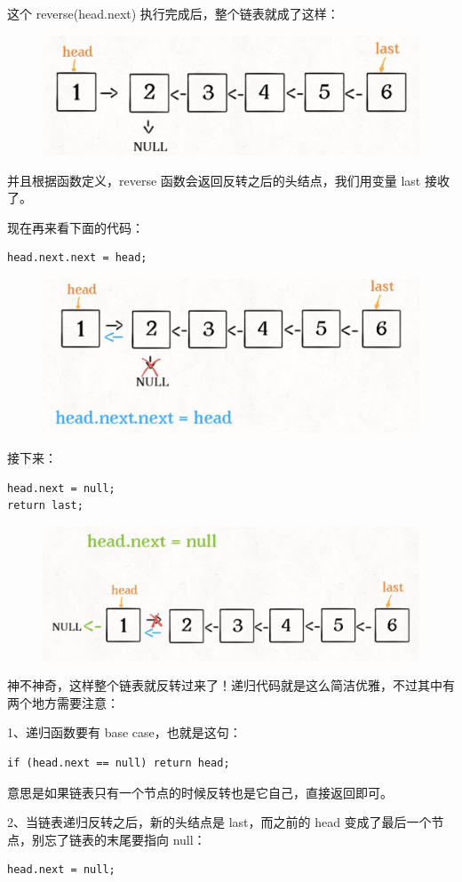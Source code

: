 \documentclass[12pt]{article}
\begin{document}
这个 reverse(head.next) 执行完成后，整个链表就成了这样：
\begin{figure}[H]
    \centering
    \includegraphics[width=.5\textwidth]{fig/Reverse_Single_List_4.png}
\end{figure}

并且根据函数定义，reverse 函数会返回反转之后的头结点，我们用变量 last 接收了。

现在再来看下面的代码：
\begin{lstlisting}
head.next.next = head;
\end{lstlisting}

\begin{figure}[H]
    \centering
    \includegraphics[width=.5\textwidth]{fig/Reverse_Single_List_5.png}
\end{figure}

接下来：
\begin{lstlisting}
head.next = null;
return last;
\end{lstlisting}

\begin{figure}[H]
    \centering
    \includegraphics[width=.5\textwidth]{fig/Reverse_Single_List_6.png}
\end{figure}

神不神奇，这样整个链表就反转过来了！递归代码就是这么简洁优雅，不过其中有两个地方需要注意：

1、递归函数要有 base case，也就是这句：
\begin{lstlisting}
if (head.next == null) return head;
\end{lstlisting}
意思是如果链表只有一个节点的时候反转也是它自己，直接返回即可。

2、当链表递归反转之后，新的头结点是 last，而之前的 head 变成了最后一个节点，别忘了链表的末尾要指向 null：
\begin{lstlisting}
head.next = null;
\end{lstlisting}
\end{document}
